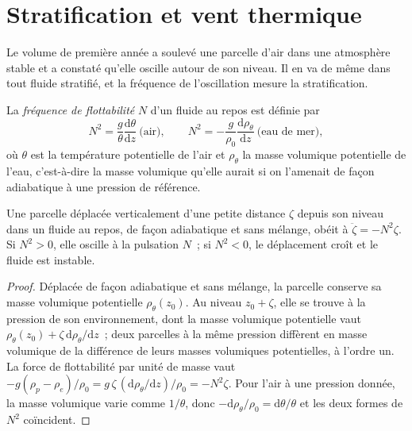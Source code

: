 \section{Stratification et vent thermique}\label{sec:b3:gfd-foundations:stratification}

Le volume de première année a soulevé une parcelle d'air dans une atmosphère stable et a constaté
qu'elle oscille autour de son niveau. Il en va de même dans tout fluide stratifié,
et la fréquence de l'oscillation mesure la stratification.

\begin{definition}\label{def:b3:gfd-foundations:buoyancy}
La \emph{fréquence de flottabilité} $N$ d'un fluide au
repos est définie par
\[
N^2 = \frac{g}{\theta}\frac{\mathrm d\theta}{\mathrm dz}\ \text{(air)},
\qquad
N^2 = -\frac{g}{\rho_0}\frac{\mathrm d\rho_\theta}{\mathrm dz}\ \text{(eau de mer)},
\]
où $\theta$ est la température potentielle de l'air et $\rho_\theta$ la
masse volumique potentielle de l'eau, c'est-à-dire la masse volumique qu'elle
aurait si on l'amenait de façon adiabatique à une pression de référence.
\end{definition}

\begin{theorem}\label{thm:b3:gfd-foundations:buoyancy}
Une parcelle déplacée verticalement d'une petite distance $\zeta$ depuis son niveau dans un
fluide au repos, de façon adiabatique et sans mélange, obéit à $\ddot\zeta =
-N^2\zeta$. Si $N^2 > 0$, elle oscille à la pulsation $N$~; si
$N^2 < 0$, le déplacement croît et le fluide est instable.
\end{theorem}

\begin{proof}
Déplacée de façon adiabatique et sans mélange, la parcelle conserve sa masse volumique
potentielle $\rho_\theta(z_0)$. Au niveau $z_0 + \zeta$, elle se trouve à la pression
de son environnement, dont la masse volumique potentielle vaut $\rho_\theta(z_0) +
\zeta\,\mathrm d\rho_\theta/\mathrm dz$~; deux parcelles à la même pression
diffèrent en masse volumique de la différence de leurs masses volumiques potentielles, à
l'ordre un. La force de flottabilité par unité de masse vaut $-g(\rho_p - \rho_e)/\rho_0 =
g\,\zeta\,(\mathrm d\rho_\theta/\mathrm dz)/\rho_0 = -N^2\zeta$. Pour l'air à une
pression donnée, la masse volumique varie comme $1/\theta$, donc $-\mathrm
d\rho_\theta/\rho_0 = \mathrm d\theta/\theta$ et les deux formes de $N^2$
coïncident.
\end{proof}

